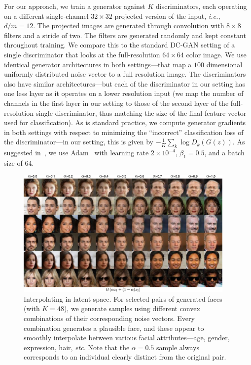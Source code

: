 \documentclass{article}
\begin{document}
For our approach, we train a generator against $K$ discriminators, each operating on a different single-channel $32\times 32$ projected version of the input, \emph{i.e.,}~$d/m=12$. The projected images are generated through convolution with $8\times 8$ filters and a stride of two. The filters are generated randomly and kept constant throughout training. We compare this to the standard DC-GAN setting of a single discriminator that looks at the full-resolution $64\times 64$ color image. We use identical generator architectures in both settings---that map a $100$ dimensional uniformly distributed noise vector to a full resolution image. The discriminators also have similar architectures---but each of the discriminator in our setting has one less layer as it operates on a lower resolution input (we map the number of channels in the first layer in our setting to those of the second layer of the full-resolution single-discriminator, thus matching the size of the final feature vector used for classification). As is standard practice, we compute generator gradients in both settings with respect to minimizing the ``incorrect'' classification loss of the discriminator---in our setting, this is given by $-\frac{1}{K}\sum_k \log D_k(G(z))$. As suggested in~\citep{radford2015unsupervised}, we use Adam~\citep{adam} with learning rate $2\times10^{-4}$, $\beta_1=0.5$, and a batch size of $64$.

\begin{figure}[!t]
  \centering
    \includegraphics[width=0.95\textwidth]{Figs/Fig4.pdf}%
\caption{Interpolating in latent space. For selected pairs of generated faces (with $K=48$), we generate samples using different convex combinations of their corresponding noise vectors. Every combination generates a plausible face, and these appear to smoothly interpolate between various facial attributes---age, gender, expression, hair, \emph{etc.} Note that the $\alpha=0.5$ sample always corresponds to an individual clearly distinct from the original pair.}
  \label{fig:interp}
\end{figure}
\end{document}
